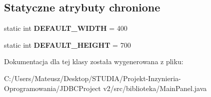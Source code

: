 \subsection*{Statyczne atrybuty chronione}
\begin{DoxyCompactItemize}
\item 
\hypertarget{classbiblioteka_1_1_main_panel_ad35e2ebd0df24b1e86d863bdc73facdd}{}static int {\bfseries D\+E\+F\+A\+U\+L\+T\+\_\+\+W\+I\+D\+T\+H} = 400\label{classbiblioteka_1_1_main_panel_ad35e2ebd0df24b1e86d863bdc73facdd}

\item 
\hypertarget{classbiblioteka_1_1_main_panel_a9c4ce53d69777e541fc122459d61bf77}{}static int {\bfseries D\+E\+F\+A\+U\+L\+T\+\_\+\+H\+E\+I\+G\+H\+T} = 700\label{classbiblioteka_1_1_main_panel_a9c4ce53d69777e541fc122459d61bf77}

\end{DoxyCompactItemize}


Dokumentacja dla tej klasy została wygenerowana z pliku\+:\begin{DoxyCompactItemize}
\item 
C\+:/\+Users/\+Mateusz/\+Desktop/\+S\+T\+U\+D\+I\+A/\+Projekt-\/\+Inzynieria-\/\+Oprogramowania/\+J\+D\+B\+C\+Project v2/src/biblioteka/Main\+Panel.\+java\end{DoxyCompactItemize}
